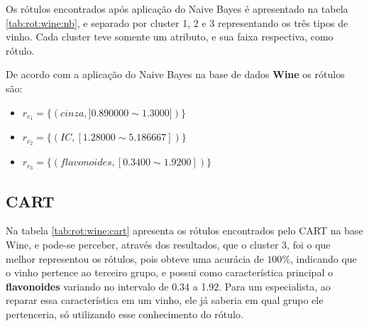 Os rótulos encontrados após aplicação do Naive Bayes é apresentado na tabela \ref{tab:rot:wine:nb}, e separado por cluster 1, 2 e 3 representando os três tipos de vinho. Cada cluster teve somente um atributo, e sua faixa respectiva, como rótulo.

\begin{table}[!h]
\centering
\caption{Resultado da aplicação do algoritmo Naive Bayes}
\label{tab:rot:wine:nb}
\end{table}


De acordo com a aplicação do Naive Bayes na base de dados \textbf{Wine} os rótulos são:

\begin{itemize}[noitemsep]
    \item ${r_{c_1}=\{ (cinza, ] 0.890000 \sim  1.3000])\} }$
    \item ${r_{c_2}=\{(IC,[  1.28000 \sim  5.186667  ] ) \} }$
    \item ${r_{c_3}=\{ (flavonoides, [ 0.3400 \sim  1.9200])\} }$
 \end{itemize}


\subsection{CART} \label{cap:resultados:ssec:wine:cart}

Na tabela \ref{tab:rot:wine:cart} apresenta os rótulos encontrados pelo CART na base Wine, e pode-se perceber, através dos resultados, que o cluster 3, foi o que melhor representou os rótulos, pois obteve uma acurácia de ${100\%}$, indicando que o vinho pertence ao terceiro grupo, e possui como característica principal o \textbf{flavonoides} variando no intervalo de 0.34 a 1.92. Para um especialista, ao reparar essa característica em um vinho, ele já saberia em qual grupo ele pertenceria, só utilizando esse conhecimento do rótulo.

